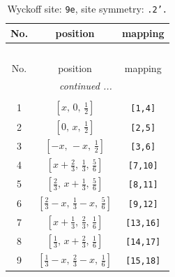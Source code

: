\documentclass[fleqn,8pt]{jsarticle}
\begin{document}
\begin{longtable}{ccc}
\caption{Wyckoff site: {\tt 9e}, site symmetry: {\tt .2'.}}
 \\
 \hline \hline
No. & position & mapping \\ \hline \endfirsthead

\multicolumn{2}{l}{\tablename\ \thetable{}} \\
 \hline \hline
No. & position & mapping \\ \hline \endhead

 \hline \hline
\multicolumn{2}{r}{\footnotesize\it continued ...} \\ \endfoot

 \hline \hline
\multicolumn{2}{r}{} \\ \endlastfoot

1 & $\left[ x,\, 0,\, \frac{1}{2} \right]$ & {\tt [1,4]} \\ \hline
2 & $\left[ 0,\, x,\, \frac{1}{2} \right]$ & {\tt [2,5]} \\ \hline
3 & $\left[ - x,\, - x,\, \frac{1}{2} \right]$ & {\tt [3,6]} \\ \hline
4 & $\left[ x + \frac{2}{3},\, \frac{1}{3},\, \frac{5}{6} \right]$ & {\tt [7,10]} \\ \hline
5 & $\left[ \frac{2}{3},\, x + \frac{1}{3},\, \frac{5}{6} \right]$ & {\tt [8,11]} \\ \hline
6 & $\left[ \frac{2}{3} - x,\, \frac{1}{3} - x,\, \frac{5}{6} \right]$ & {\tt [9,12]} \\ \hline
7 & $\left[ x + \frac{1}{3},\, \frac{2}{3},\, \frac{1}{6} \right]$ & {\tt [13,16]} \\ \hline
8 & $\left[ \frac{1}{3},\, x + \frac{2}{3},\, \frac{1}{6} \right]$ & {\tt [14,17]} \\ \hline
9 & $\left[ \frac{1}{3} - x,\, \frac{2}{3} - x,\, \frac{1}{6} \right]$ & {\tt [15,18]} \\
\end{longtable}
\renewcommand{\arraystretch}{1.2}
\end{document}
